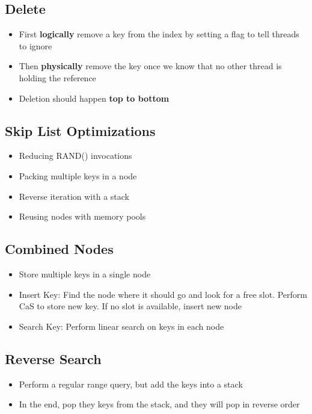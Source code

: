 \documentclass[11pt]{article}
\begin{document}
\subsection*{\textbf{Delete}}
    \begin{itemize}
        \item First \textbf{logically} remove a key from the index by setting a flag to tell threads to ignore
        \item Then \textbf{physically} remove the key once we know that no other thread is holding the reference
        \item Deletion should happen \textbf{top to bottom}
    \end{itemize}

\subsection*{Skip List Optimizations~\cite{skiplists-done-right2016}}
    \begin{itemize}
        \item Reducing RAND() invocations
        \item Packing multiple keys in a node
        \item Reverse iteration with a stack
        \item Reusing nodes with memory pools
    \end{itemize}
\subsection*{\textbf{Combined Nodes}}
    \begin{itemize}
        \item Store multiple keys in a single node
        \item Insert Key: Find the node where it should go and look for a free slot. Perform CaS to store new key. If no slot is available, insert new node
        \item Search Key: Perform linear search on keys in each node
    \end{itemize}
\subsection*{\textbf{Reverse Search}}
    \begin{itemize}
        \item Perform a regular range query, but add the keys into a stack
        \item In the end, pop they keys from the stack, and they will pop in reverse order
    \end{itemize}
\end{document}
